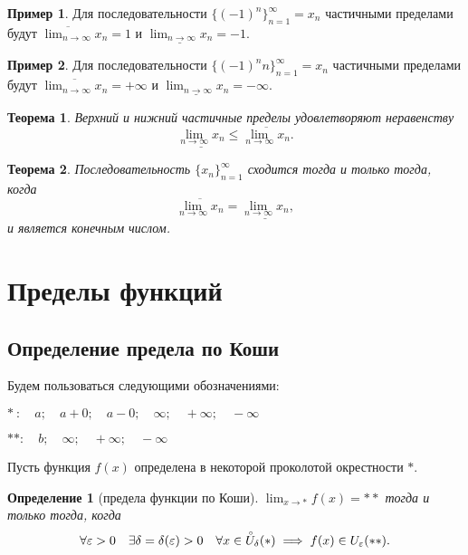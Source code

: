 \documentclass[a4paper,12pt]{article} %
\newtheorem{definition}{Определение}[section]
\newtheorem{theorem}{Теорема}[section]
\theoremstyle{remark}
\theoremstyle{definition}
\newtheorem{exmp}{Пример}[section]
\begin{document}
	\begin{exmp}
		Для последовательности $\{(-1)^{n}\}_{n=1}^{\infty} = x_n$ частичными пределами будут $\overline{\lim_{n \to \infty}} x_n = 1$ и $\underline{\lim_{n \to \infty} x_n} = -1$.
	\end{exmp}

	\begin{exmp}
		Для последовательности $\{(-1)^{n}n\}_{n=1}^{\infty} = x_n$ частичными пределами будут $\overline{\lim_{n \to \infty} x_n} = +\infty$ и $\underline{\lim_{n \to \infty} x_n} = -\infty$.
	\end{exmp}

	\begin{theorem}
		Верхний и нижний частичные пределы удовлетворяют неравенству
	\[
		\underline{\lim_{n \to \infty} x_n} \le \overline{\lim_{n \to \infty} x_n}
	.\] 
	\end{theorem}

\begin{theorem}
	Последовательность $\{x_n\}_{n=1}^{\infty}$ сходится тогда и только тогда, когда
	\[
		\overline{\lim_{n \to \infty} x_n} = \underline{\lim_{n \to \infty} x_n},
	\] 
	и является конечным числом.
\end{theorem}




\newpage
\section{Пределы функций} 
\subsection{Определение предела по Коши}
Будем пользоваться следующими обозначениями:

$* \ : \quad a; \quad a+0; \quad a-0; \quad \infty; \quad +\infty; \quad -\infty$
 
$** : \quad b; \quad \infty; \quad +\infty; \quad -\infty$

\noindent Пусть функция $f(x)$ определена в некоторой проколотой окрестности $*$.
\begin{definition}[предела функции по Коши] $\lim_{x \to *} f(x) = **$ тогда и только тогда, когда
	\[
	\forall \varepsilon>0 \quad \exists \delta=\delta(\varepsilon)>0 \quad \forall x\in  \accentset{\circ}{U}_\delta(*)  \implies f(x) \in  U_\varepsilon(**)
	.\] 
\end{definition}
\end{document}
